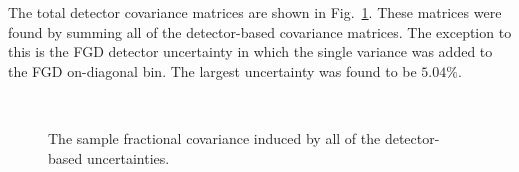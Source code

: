 \newline
\newline
The total detector covariance matrices are shown in Fig.~\ref{fig:DetectorCovarianceMatrices}.  These matrices were found by summing all of the detector-based covariance matrices.  The exception to this is the FGD detector uncertainty in which the single variance was added to the FGD on-diagonal bin.  The largest uncertainty was found to be $5.04\%$.
\begin{figure}%
  \centering
  \\
  \caption{The sample fractional covariance induced by all of the detector-based uncertainties.}
  \label{fig:DetectorCovarianceMatrices}
\end{figure}
